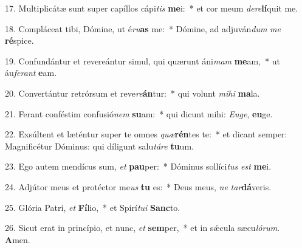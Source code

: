 17. Multiplicátæ sunt super capíllos cápi\textit{tis} \textbf{me}i:~*  et cor meum \textit{de}\textit{re}\textbf{lí}quit me.\

18. Compláceat tibi, Dómine, ut é\textit{ru}\textbf{as} me:~*  Dómine, ad adjuván\textit{dum} \textit{me} \textbf{ré}spice.\

19. Confundántur et revereántur simul, qui quærunt áni\textit{mam} \textbf{me}am,~*  ut áu\textit{fe}\textit{rant} \textbf{e}am.\

20. Convertántur retrórsum et reve\textit{re}\textbf{án}tur:~*  qui volunt \textit{mi}\textit{hi} \textbf{ma}la.\

21. Ferant conféstim confusió\textit{nem} \textbf{su}am:~*  qui dicunt mihi: \textit{Eu}\textit{ge}, \textbf{eu}ge.\

22. Exsúltent et læténtur super te omnes \textit{quæ}\textbf{rén}tes te:~*  et dicant semper: Magnificétur Dóminus: qui díligunt salu\textit{tá}\textit{re} \textbf{tu}um.\

23. Ego autem mendícus sum, \textit{et} \textbf{pau}per:~*  Dóminus sollíci\textit{tus} \textit{est} \textbf{me}i.\

24. Adjútor meus et protéctor me\textit{us} \textbf{tu} es:~*  Deus meus, \textit{ne} \textit{tar}\textbf{dá}veris.\

25. Glória Patri, \textit{et} \textbf{Fí}lio,~*  et Spirí\textit{tu}\textit{i} \textbf{Sanc}to.\

26. Sicut erat in princípio, et nunc, \textit{et} \textbf{sem}per,~*  et in sǽcula sæcu\textit{ló}\textit{rum}. \textbf{A}men.\


